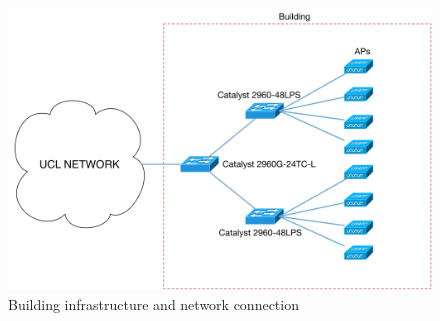 \begin{figure}[H]
	\includegraphics[width=1\linewidth]{Pictures/Chapter2/building.png}
	\caption{Building infrastructure and network connection}
\end{figure}







